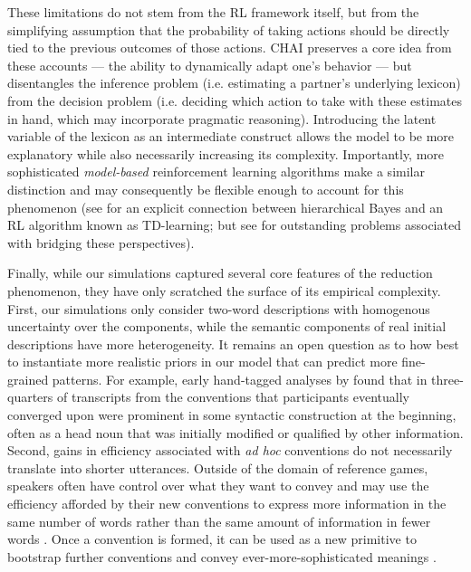 These limitations do not stem from the RL framework itself, but from the simplifying assumption that the probability of taking actions should be directly tied to the previous outcomes of those actions.
CHAI preserves a core idea from these accounts --- the ability to dynamically adapt one's behavior --- but disentangles the inference problem (i.e. estimating a partner's underlying lexicon) from the decision problem (i.e. deciding which action to take with these estimates in hand, which may incorporate pragmatic reasoning).
Introducing the latent variable of the lexicon as an intermediate construct allows the model to be more explanatory while also necessarily increasing its complexity.
Importantly, more sophisticated \emph{model-based} reinforcement learning algorithms make a similar distinction and may consequently be flexible enough to account for this phenomenon (see  for an explicit connection between hierarchical Bayes and an RL algorithm known as TD-learning; but see  for outstanding problems associated with bridging these perspectives).

Finally, while our simulations captured several core features of the reduction phenomenon, they have only scratched the surface of its empirical complexity.
First, our simulations only consider two-word descriptions with homogenous uncertainty over the components, while the semantic components of real initial descriptions have more heterogeneity. 
It remains an open question as to how best to instantiate more realistic priors in our model that can predict more fine-grained patterns. 
For example, early hand-tagged analyses by  found that in three-quarters of transcripts from  the conventions that participants eventually converged upon were prominent in some syntactic construction at the beginning, often as a head noun that was initially modified or qualified by other information. 
Second, gains in efficiency associated with \emph{ad hoc} conventions do not necessarily translate into shorter utterances.
Outside of the domain of reference games, speakers often have control over what they want to convey and may use the efficiency afforded by their new conventions to express more information in the same number of words rather than the same amount of information in fewer words \cite{effenberger2021analysis}. 
Once a convention is formed, it can be used as a new primitive to bootstrap further conventions and convey ever-more-sophisticated meanings \cite{mccarthy2021learning}.





